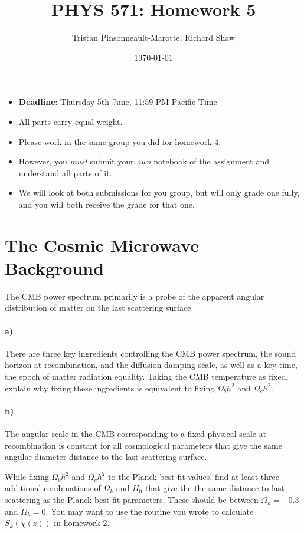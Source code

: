 \documentclass[12pt]{article}
\author{Tristan Pinsonneault-Marotte, Richard Shaw}
\title{PHYS 571: Homework 5}
\date{\today}
\begin{document}
\maketitle


\begin{itemize}
    \item \textbf{Deadline}: Thursday 5th June, 11:59 PM Pacific Time
    \item All parts carry equal weight.
    \item Please work in the same group you did for homework 4.
    \item However, you \emph{must} submit your \emph{own} notebook of the assignment and understand all parts of it.
    \item We will look at both submissions for you group, but will only grade one fully, and you will both receive the grade for that one.
\end{itemize}

\section{The Cosmic Microwave Background}

The CMB power spectrum primarily is a probe of the apparent angular distribution of matter on the last scattering surface.

\paragraph{a)} There are three key ingredients controlling the CMB power spectrum, the sound horizon at recombination, and the diffusion damping scale, as well as a key time, the epoch of matter radiation equality. Taking the CMB temperature as fixed, explain why fixing these ingredients is equivalent to fixing $\Omega_b h^2$ and $\Omega_c h^2$.

\paragraph{b)} The angular scale in the CMB corresponding to a fixed physical scale at recombination is constant for all cosmological parameters that give the same angular diameter distance to the last scattering surface.

While fixing $\Omega_b h^2$ and $\Omega_c h^2$ to the Planck best fit values, find at least three additional combinations of $\Omega_k$ and $H_0$ that give the the same distance to last scattering as the Planck best fit parameters. These should be between $\Omega_k = -0.3$ and $\Omega_k = 0$. You may want to use the routine you wrote to calculate $S_k(\chi(z))$ in homework 2.
\end{document}
